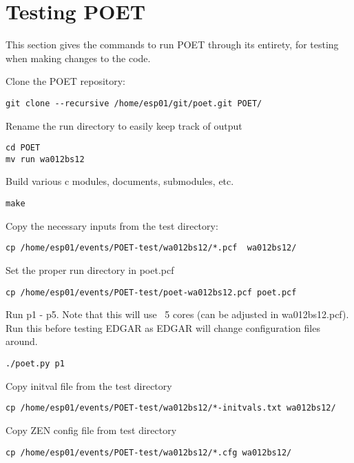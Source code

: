 \documentclass[letterpaper,12pt]{article}
\begin{document}
\section{Testing POET}
This section gives the commands to run POET through its entirety,
for testing when making changes to the code.

Clone the POET repository:

\begin{verbatim}
git clone --recursive /home/esp01/git/poet.git POET/
\end{verbatim}

Rename the run directory to easily keep track of output

\begin{verbatim}
cd POET
mv run wa012bs12
\end{verbatim}

Build various c modules, documents, submodules, etc.

\begin{verbatim}
make
\end{verbatim}

Copy the necessary inputs from the test directory:

\begin{verbatim}
cp /home/esp01/events/POET-test/wa012bs12/*.pcf  wa012bs12/
\end{verbatim}

Set the proper run directory in poet.pcf

\begin{verbatim}
cp /home/esp01/events/POET-test/poet-wa012bs12.pcf poet.pcf
\end{verbatim}

Run p1 - p5. Note that this will use ~5 cores (can be adjusted in
wa012bs12.pcf). Run this before testing EDGAR as EDGAR will change
configuration files around.

\begin{verbatim}
./poet.py p1
\end{verbatim}

Copy initval file from the test directory

\begin{verbatim}
cp /home/esp01/events/POET-test/wa012bs12/*-initvals.txt wa012bs12/
\end{verbatim}

Copy ZEN config file from test directory

\begin{verbatim}
cp /home/esp01/events/POET-test/wa012bs12/*.cfg wa012bs12/
\end{verbatim}
\end{document}
